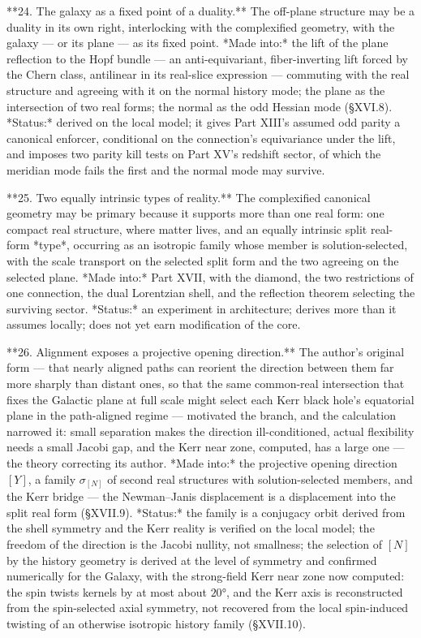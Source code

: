**24. The galaxy as a fixed point of a duality.** The off-plane structure may be a duality in its own right, interlocking with the complexified geometry, with the galaxy — or its plane — as its fixed point. *Made into:* the lift of the plane reflection to the Hopf bundle — an anti-equivariant, fiber-inverting lift forced by the Chern class, antilinear in its real-slice expression — commuting with the real structure and agreeing with it on the normal history mode; the plane as the intersection of two real forms; the normal as the odd Hessian mode (§XVI.8). *Status:* derived on the local model; it gives Part XIII's assumed odd parity a canonical enforcer, conditional on the connection's equivariance under the lift, and imposes two parity kill tests on Part XV's redshift sector, of which the meridian mode fails the first and the normal mode may survive.

**25. Two equally intrinsic types of reality.** The complexified canonical geometry may be primary because it supports more than one real form: one compact real structure, where matter lives, and an equally intrinsic split real-form *type*, occurring as an isotropic family whose member is solution-selected, with the scale transport on the selected split form and the two agreeing on the selected plane. *Made into:* Part XVII, with the diamond, the two restrictions of one connection, the dual Lorentzian shell, and the reflection theorem selecting the surviving sector. *Status:* an experiment in architecture; derives more than it assumes locally; does not yet earn modification of the core.

**26. Alignment exposes a projective opening direction.** The author's original form — that nearly aligned paths can reorient the direction between them far more sharply than distant ones, so that the same common-real intersection that fixes the Galactic plane at full scale might select each Kerr black hole's equatorial plane in the path-aligned regime — motivated the branch, and the calculation narrowed it: small separation makes the direction ill-conditioned, actual flexibility needs a small Jacobi gap, and the Kerr near zone, computed, has a large one — the theory correcting its author. *Made into:* the projective opening direction $[Y]$, a family $\sigma_{[N]}$ of second real structures with solution-selected members, and the Kerr bridge — the Newman–Janis displacement is a displacement into the split real form (§XVII.9). *Status:* the family is a conjugacy orbit derived from the shell symmetry and the Kerr reality is verified on the local model; the freedom of the direction is the Jacobi nullity, not smallness; the selection of $[N]$ by the history geometry is derived at the level of symmetry and confirmed numerically for the Galaxy, with the strong-field Kerr near zone now computed: the spin twists kernels by at most about $20°$, and the Kerr axis is reconstructed from the spin-selected axial symmetry, not recovered from the local spin-induced twisting of an otherwise isotropic history family (§XVII.10).

